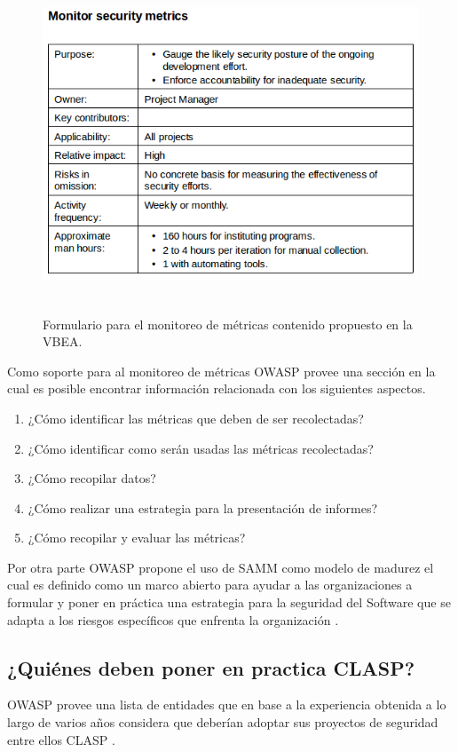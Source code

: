 \documentclass[runningheads,a4paper]{llncs}
\begin{document}
\begin{figure}
\centering
\includegraphics[height=10.0cm, width=12.0cm]{sa_figura_14}
\caption{Formulario para el monitoreo de métricas contenido propuesto en la \gls{VBEA}.}
\label{fig:example}
\end{figure}

Como soporte para al monitoreo de métricas \gls{OWASP} provee una sección en la cual es posible encontrar información relacionada con los siguientes aspectos.

\begin{enumerate}
	\item ¿Cómo identificar las métricas que deben de ser recolectadas?
	\item ¿Cómo identificar como serán usadas las métricas recolectadas?
	\item ¿Cómo recopilar datos?
	\item ¿Cómo realizar una estrategia para la presentación de informes?
	\item ¿Cómo recopilar y evaluar las métricas?\\
	
\end{enumerate} 
Por otra parte \gls{OWASP} propone el uso de \gls{SAMM} como modelo de madurez el cual es definido como un marco abierto para ayudar a las organizaciones a formular y poner en práctica una estrategia para la seguridad del \gls{Software} que se adapta a los riesgos específicos que enfrenta la organización \cite{SAMMIntroduction}.


\subsection{¿Quiénes deben poner en practica \gls{CLASP}?}
\gls{OWASP} provee una lista de entidades que en base a la experiencia obtenida a lo largo de varios años considera que deberían adoptar sus proyectos de seguridad entre ellos \gls{CLASP} \cite{OWASPIntroduction}.\\
\end{document}
